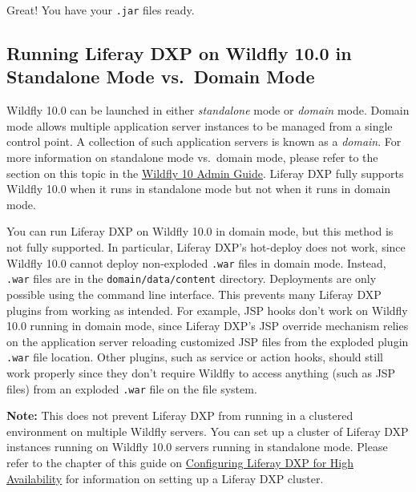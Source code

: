 Great! You have your \texttt{.jar} files ready.

\subsection{Running Liferay DXP on Wildfly 10.0 in Standalone Mode
vs.~Domain
Mode}\label{running-liferay-dxp-on-wildfly-10.0-in-standalone-mode-vs.-domain-mode}

Wildfly 10.0 can be launched in either \emph{standalone} mode or
\emph{domain} mode. Domain mode allows multiple application server
instances to be managed from a single control point. A collection of
such application servers is known as a \emph{domain}. For more
information on standalone mode vs.~domain mode, please refer to the
section on this topic in the
\href{https://docs.jboss.org/author/display/WFLY10/Admin+Guide\#AdminGuide-Operatingmodes}{Wildfly
10 Admin Guide}. Liferay DXP fully supports Wildfly 10.0 when it runs in
standalone mode but not when it runs in domain mode.

You can run Liferay DXP on Wildfly 10.0 in domain mode, but this method
is not fully supported. In particular, Liferay DXP's hot-deploy does not
work, since Wildfly 10.0 cannot deploy non-exploded \texttt{.war} files
in domain mode. Instead, \texttt{.war} files are in the
\texttt{domain/data/content} directory. Deployments are only possible
using the command line interface. This prevents many Liferay DXP plugins
from working as intended. For example, JSP hooks don't work on Wildfly
10.0 running in domain mode, since Liferay DXP's JSP override mechanism
relies on the application server reloading customized JSP files from the
exploded plugin \texttt{.war} file location. Other plugins, such as
service or action hooks, should still work properly since they don't
require Wildfly to access anything (such as JSP files) from an exploded
\texttt{.war} file on the file system.

\noindent\hrulefill

\textbf{Note:} This does not prevent Liferay DXP from running in a
clustered environment on multiple Wildfly servers. You can set up a
cluster of Liferay DXP instances running on Wildfly 10.0 servers running
in standalone mode. Please refer to the chapter of this guide on
\href{/docs/6-2/deploy/-/knowledge_base/d/configuring-liferay-for-high-availability}{Configuring
Liferay DXP for High Availability} for information on setting up a
Liferay DXP cluster.

\noindent\hrulefill

